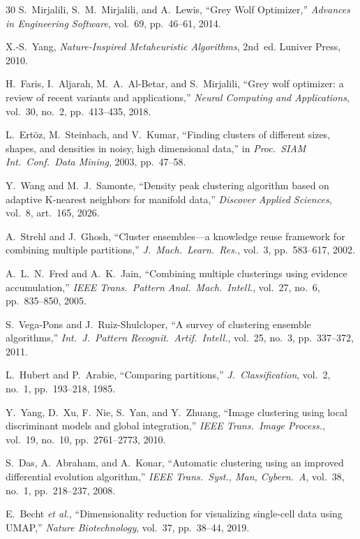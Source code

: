 \documentclass[conference]{IEEEtran}
\begin{document}
\begin{thebibliography}{30}
S.~Mirjalili, S.~M.~Mirjalili, and A.~Lewis, ``Grey Wolf Optimizer,'' \emph{Advances in Engineering Software}, vol.~69, pp.~46--61, 2014.

X.-S.~Yang, \emph{Nature-Inspired Metaheuristic Algorithms}, 2nd~ed. Luniver Press, 2010.

H.~Faris, I.~Aljarah, M.~A.~Al-Betar, and S.~Mirjalili, ``Grey wolf optimizer: a review of recent variants and applications,'' \emph{Neural Computing and Applications}, vol.~30, no.~2, pp.~413--435, 2018.

L.~Ert\"{o}z, M.~Steinbach, and V.~Kumar, ``Finding clusters of different sizes, shapes, and densities in noisy, high dimensional data,'' in \emph{Proc.\ SIAM Int.\ Conf.\ Data Mining}, 2003, pp.~47--58.

Y.~Wang and M.~J.~Samonte, ``Density peak clustering algorithm based on adaptive K-nearest neighbors for manifold data,'' \emph{Discover Applied Sciences}, vol.~8, art.~165, 2026.

A.~Strehl and J.~Ghosh, ``Cluster ensembles---a knowledge reuse framework for combining multiple partitions,'' \emph{J.\ Mach.\ Learn.\ Res.}, vol.~3, pp.~583--617, 2002.

A.~L.~N.~Fred and A.~K.~Jain, ``Combining multiple clusterings using evidence accumulation,'' \emph{IEEE Trans.\ Pattern Anal.\ Mach.\ Intell.}, vol.~27, no.~6, pp.~835--850, 2005.

S.~Vega-Pons and J.~Ruiz-Shulcloper, ``A survey of clustering ensemble algorithms,'' \emph{Int.\ J.\ Pattern Recognit.\ Artif.\ Intell.}, vol.~25, no.~3, pp.~337--372, 2011.

L.~Hubert and P.~Arabie, ``Comparing partitions,'' \emph{J.\ Classification}, vol.~2, no.~1, pp.~193--218, 1985.

Y.~Yang, D.~Xu, F.~Nie, S.~Yan, and Y.~Zhuang, ``Image clustering using local discriminant models and global integration,'' \emph{IEEE Trans.\ Image Process.}, vol.~19, no.~10, pp.~2761--2773, 2010.

S.~Das, A.~Abraham, and A.~Konar, ``Automatic clustering using an improved differential evolution algorithm,'' \emph{IEEE Trans.\ Syst., Man, Cybern.\ A}, vol.~38, no.~1, pp.~218--237, 2008.

E.~Becht \emph{et al.}, ``Dimensionality reduction for visualizing single-cell data using UMAP,'' \emph{Nature Biotechnology}, vol.~37, pp.~38--44, 2019.


\end{thebibliography}
\end{document}
